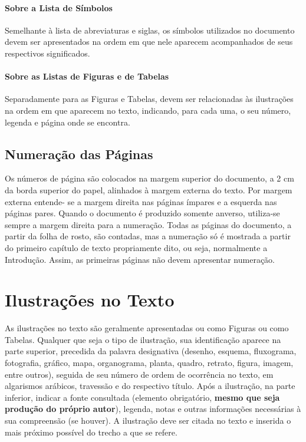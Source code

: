 \documentclass[
	oneside,
	english,brazil,				%
	mestrado,ppgc
	]
	{infufrgs}
\begin{document}
\subsubsection{Sobre a Lista de Símbolos}
Semelhante à lista de abreviaturas e siglas, os símbolos utilizados no documento
devem ser apresentados na ordem em que nele aparecem acompanhados de seus respectivos
significados.

\subsubsection{Sobre as Listas de Figuras e de Tabelas}
Separadamente para as Figuras e Tabelas, devem ser relacionadas às ilustrações na
ordem em que aparecem no texto, indicando, para cada uma, o seu número, legenda e página
onde se encontra.

\section{Numeração das Páginas}
Os números de página são colocados na margem superior do documento, a 2 cm da
borda superior do papel, alinhados à margem externa do texto. Por margem externa entende-
se a margem direita nas páginas ímpares e a esquerda nas páginas pares. Quando o documento
é produzido somente anverso, utiliza-se sempre a margem direita para a numeração. Todas as
páginas do documento, a partir da folha de rosto, são contadas, mas a numeração só é
mostrada a partir do primeiro capítulo de texto propriamente dito, ou seja, normalmente a
Introdução. Assim, as primeiras páginas não devem apresentar numeração.



\chapter{Ilustrações no Texto}
As ilustrações no texto são geralmente apresentadas ou como Figuras ou como
Tabelas. Qualquer que seja o tipo de ilustração, sua identificação aparece na parte superior, precedida da palavra designativa (desenho, esquema, fluxograma, fotografia, gráfico, mapa, organograma, planta, quadro, retrato, figura, imagem, entre outros), seguida de seu número de ordem de ocorrência no texto, em algarismos arábicos, travessão e do respectivo título. Após a ilustração, na parte inferior, indicar a fonte consultada (elemento obrigatório, \textbf{mesmo que seja produção do próprio autor}), legenda, notas e outras informações necessárias à sua compreensão (se houver). A ilustração deve ser citada no texto e inserida o mais próximo possível do trecho a que se refere.
\end{document}
